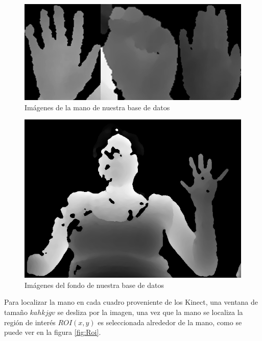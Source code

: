 \begin{figure}[h!]
\begin{center}
\includegraphics[scale=.5]{./Figures/TrainingImages.png}
\end{center}
\caption{Imágenes de la mano de nuestra base de datos}
\label{fig:ImagenesPoses}
\end{figure}  

\begin{figure}[h!]
\begin{center}
\includegraphics[scale=.5]{./Figures/166_W13.png}
\end{center}
\caption{Imágenes del fondo de nuestra base de datos}
\label{fig:ImagenFondo}
\end{figure}  

Para localizar la mano en cada cuadro proveniente de los Kinect, una ventana de tamaño $kahkjgv$ se desliza por la imagen, una vez que la mano se localiza la región de interés $ROI(x,y)$ es seleccionada alrededor de la mano, como se puede ver en la figura \ref{fig:Roi}.

